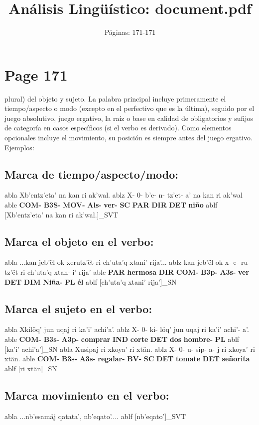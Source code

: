 \documentclass{article}%
\title{Análisis Lingüístico: document.pdf}%
\author{Páginas: 171{-}171}%
\begin{document}
%
\normalsize%
\maketitle%
\section{Page 171}%
\label{sec:Page171}%

%
plural) del objeto y sujeto. La palabra principal incluye primeramente el tiempo/aspecto %
o modo (excepto en el perfectivo que es la última), seguido por el juego absolutivo, %
juego ergativo, la raíz o base en calidad de obligatorios y sufijos de categoría en casos %
específicos (si el verbo es derivado). Como elementos opcionales incluye el movimiento, %
su posición es siempre antes del juego ergativo. Ejemplos: %
\subsection{Marca de tiempo/aspecto/modo:}%
\label{subsec:Marcadetiempo/aspecto/modo}%

%
\ex
  	abla Xb'entz'eta' na kan ri ak'wal.
  	ablz X- 0- b'e- n- tz'et- a' na kan ri ak'wal
  	able \textbf{COM-} \textbf{B3S-} \textbf{MOV-} \textbf{Als-} \textbf{ver-} \textbf{SC} \textbf{PAR} \textbf{DIR} \textbf{DET} \textbf{niño}
  	ablf [Xb'entz'eta' na kan ri ak'wal.]_{SVT}
\subsection{Marca el objeto en el verbo:}%
\label{subsec:Marcaelobjetoenelverbo}%

%
\ex
  	abla ...kan jeb'ël ok xerutz'ët ri ch'uta'q xtani' rija'...
  	ablz kan jeb'ël ok x- e- ru- tz'ët ri ch'uta'q xtan- i' rija'
  	able \textbf{PAR} \textbf{hermosa} \textbf{DIR} \textbf{COM-} \textbf{B3p-} \textbf{A3s-} \textbf{ver} \textbf{DET} \textbf{DIM} \textbf{Niña-} \textbf{PL} \textbf{él}
  	ablf [ch'uta'q xtani' rija']_{SN}
\subsection{Marca el sujeto en el verbo:}%
\label{subsec:Marcaelsujetoenelverbo}%

%
\ex
  	abla Xkilöq' jun uqaj ri ka'i' achi'a'.
  	ablz X- 0- ki- löq' jun uqaj ri ka'i' achi'- a'.
  	able \textbf{COM-} \textbf{B3s-} \textbf{A3p-} \textbf{comprar} \textbf{IND} \textbf{corte} \textbf{DET} \textbf{dos} \textbf{hombre-} \textbf{PL}
  	ablf [ka'i' achi'a']_{SN}
\ex
  	abla Xusipaj ri xkoya' ri xtän.
  	ablz X- 0- u- sip- a- j ri xkoya' ri xtän.
  	able \textbf{COM-} \textbf{B3s-} \textbf{A3s-} \textbf{regalar-} \textbf{BV-} \textbf{SC} \textbf{DET} \textbf{tomate} \textbf{DET} \textbf{señorita}
  	ablf [ri xtän]_{SN}
\subsection{Marca movimiento en el verbo:}%
\label{subsec:Marcamovimientoenelverbo}%

%
\ex
  	abla ...nb'esamäj qatata', nb'eqato'....
  	ablf [nb'eqato']_{SVT}
\end{document}
